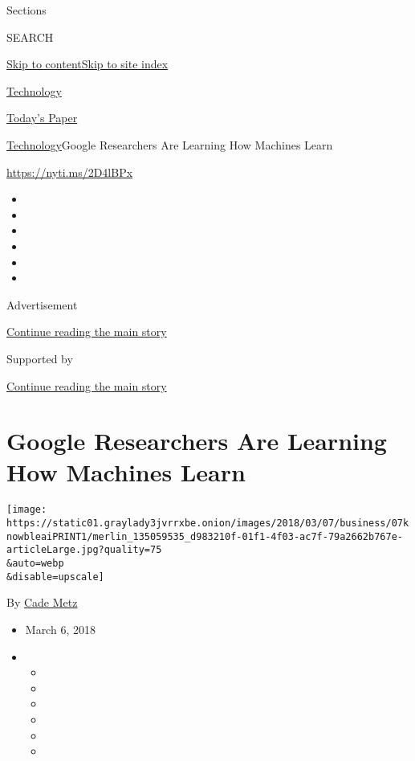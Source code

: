 Sections

SEARCH

\protect\hyperlink{site-content}{Skip to
content}\protect\hyperlink{site-index}{Skip to site index}

\href{https://www.nytimes3xbfgragh.onion/section/technology}{Technology}

\href{https://myaccount.nytimes3xbfgragh.onion/auth/login?response_type=cookie\&client_id=vi}{}

\href{https://www.nytimes3xbfgragh.onion/section/todayspaper}{Today's
Paper}

\href{/section/technology}{Technology}\textbar{}Google Researchers Are
Learning How Machines Learn

\url{https://nyti.ms/2D4lBPx}

\begin{itemize}
\item
\item
\item
\item
\item
\item
\end{itemize}

Advertisement

\protect\hyperlink{after-top}{Continue reading the main story}

Supported by

\protect\hyperlink{after-sponsor}{Continue reading the main story}

\hypertarget{google-researchers-are-learning-how-machines-learn}{%
\section{Google Researchers Are Learning How Machines
Learn}\label{google-researchers-are-learning-how-machines-learn}}

\texttt{[image: https://static01.graylady3jvrrxbe.onion/images/2018/03/07/business/07knowbleaiPRINT1/merlin\_135059535\_d983210f-01f1-4f03-ac7f-79a2662b767e-articleLarge.jpg?quality=75\\\&auto=webp\\\&disable=upscale]}

By \href{https://www.nytimes3xbfgragh.onion/by/cade-metz}{Cade Metz}

\begin{itemize}
\item
  March 6, 2018
\item
  \begin{itemize}
  \item
  \item
  \item
  \item
  \item
  \item
  \end{itemize}
\end{itemize}

